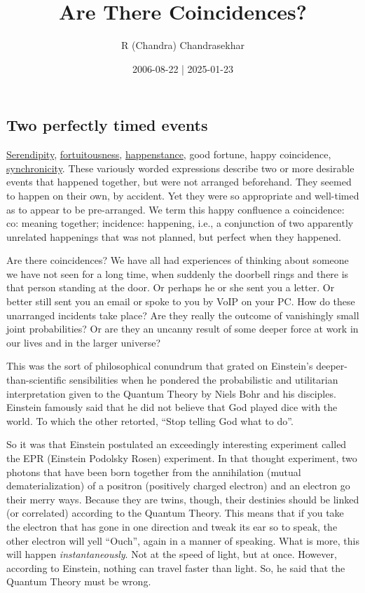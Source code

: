 \documentclass[
  a4paper,
]{article}
\title{Are There Coincidences?}
\author{R (Chandra) Chandrasekhar}
\date{2006-08-22 | 2025-01-23}
\begin{document}
\maketitle

\thispagestyle{empty}


\subsection{Two perfectly timed
events}\label{two-perfectly-timed-events}

\href{https://www.merriam-webster.com/dictionary/serendipity}{Serendipity},
\href{https://dictionary.cambridge.org/dictionary/english/fortuitousness}{fortuitousness},
\href{https://www.collinsdictionary.com/dictionary/english/happenstance}{happenstance},
good fortune, happy coincidence,
\href{https://www.vocabulary.com/dictionary/synchronicity}{synchronicity}.
These variously worded expressions describe two or more desirable events
that happened together, but were not arranged beforehand. They seemed to
happen on their own, by accident. Yet they were so appropriate and
well-timed as to appear to be pre-arranged. We term this happy
confluence a coincidence: co: meaning together; incidence: happening,
i.e., a conjunction of two apparently unrelated happenings that was not
planned, but perfect when they happened.

Are there coincidences? We have all had experiences of thinking about
someone we have not seen for a long time, when suddenly the doorbell
rings and there is that person standing at the door. Or perhaps he or
she sent you a letter. Or better still sent you an email or spoke to you
by VoIP on your PC. How do these unarranged incidents take place? Are
they really the outcome of vanishingly small joint probabilities? Or are
they an uncanny result of some deeper force at work in our lives and in
the larger universe?

This was the sort of philosophical conundrum that grated on Einstein's
deeper-than-scientific sensibilities when he pondered the probabilistic
and utilitarian interpretation given to the Quantum Theory by Niels Bohr
and his disciples. Einstein famously said that he did not believe that
God played dice with the world. To which the other retorted, ``Stop
telling God what to do''.

So it was that Einstein postulated an exceedingly interesting experiment
called the EPR (Einstein Podolsky Rosen) experiment. In that thought
experiment, two photons that have been born together from the
annihilation (mutual dematerialization) of a positron (positively
charged electron) and an electron go their merry ways. Because they are
twins, though, their destinies should be linked (or correlated)
according to the Quantum Theory. This means that if you take the
electron that has gone in one direction and tweak its ear so to speak,
the other electron will yell ``Ouch'', again in a manner of speaking.
What is more, this will happen \emph{instantaneously}. Not at the speed
of light, but at once. However, according to Einstein, nothing can
travel faster than light. So, he said that the Quantum Theory must be
wrong.
\end{document}
